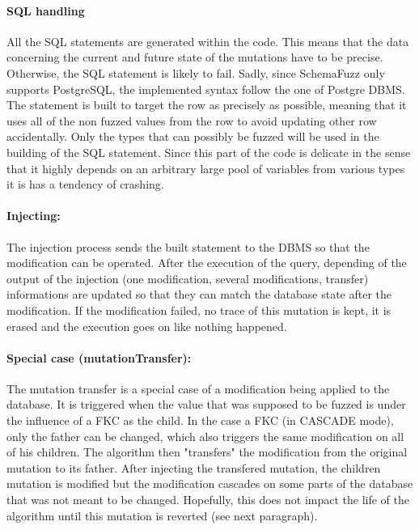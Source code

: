 \documentclass{article}
\begin{document}
\begin{empfile}
				\paragraph{SQL handling}
All the SQL statements are generated within the code. This means that the data concerning the current and future state of the mutations have to be   precise. Otherwise, the SQL statement is   likely to fail. Sadly, since SchemaFuzz only supports PostgreSQL, the implemented syntax follow the one of Postgre
DBMS. The statement is built to target the row as precisely as possible, meaning that it uses all of the non fuzzed values from the row to avoid updating other row accidentally. Only the types that can possibly be fuzzed will be used in the building of the SQL statement. Since this part of the code is delicate in the sense that it highly depends on an arbitrary large pool of variables from various types it is has a tendency of crashing. 
				
				\paragraph{Injecting:}
The injection process sends the built statement to the DBMS so that the modification can be operated. After the execution of the query, depending of the output of the injection (one modification, several modifications, transfer) informations are updated so that they can match the database state after the modification. If the modification failed, no trace of this mutation is kept, it is erased and the execution goes on like nothing happened.  				
				\paragraph{Special case (mutationTransfer):}
The mutation transfer is a special case of a modification being applied to the database.
It is triggered when the value that was supposed to be fuzzed is under the influence of a FKC as the child.
In the case a FKC (in CASCADE mode), only the father can be changed, which also triggers the same modification on all of his children. The algorithm then "transfers" the modification from the original mutation to its father.
After injecting the transfered mutation, the children mutation is modified but the modification cascades on some parts of the database that was not meant to be changed.
Hopefully, this does not impact the life of the algorithm until this mutation is reverted (see next paragraph).

\end{empfile}
\end{document}
